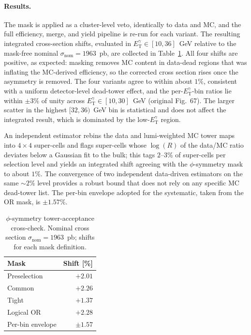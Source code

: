 \documentclass[11pt]{article}
\newcommand{\ETg}{E_{\mathrm{T}}^{\gamma}}
\begin{document}
\paragraph{Results.} The mask is applied as a cluster-level veto, identically to
data and MC, and the full efficiency, merge, and yield pipeline is re-run for each
variant. The resulting integrated cross-section shifts, evaluated in
$\ETg\in[10,36]$~GeV relative to the mask-free nominal
$\sigma_{\mathrm{nom}}=1963$~pb, are collected in Table~\ref{tab:phisym}. All four
shifts are positive, as expected: masking removes MC content in data-dead regions
that was inflating the MC-derived efficiency, so the corrected cross section rises
once the asymmetry is removed. The four variants agree to within about $1\%$,
consistent with a uniform detector-level dead-tower effect, and the per-$\ETg$-bin
ratios lie within $\pm3\%$ of unity across $\ETg\in[10,30]$~GeV (original Fig.~67).
The larger scatter in the highest $[32,36)$~GeV bin is statistical and does not
affect the integrated result, which is dominated by the low-$\ETg$ region.

An independent estimator rebins the data and lumi-weighted MC tower maps into
$4\times4$ super-cells and flags super-cells whose $\log(R)$ of the data/MC ratio
deviates below a Gaussian fit to the bulk; this tags $2$--$3\%$ of super-cells per
selection level and yields an integrated shift agreeing with the $\phi$-symmetry
mask to about $1\%$. The convergence of two independent data-driven estimators on
the same $\sim2\%$ level provides a robust bound that does not rely on any specific
MC dead-tower list. The per-bin envelope adopted for the systematic, taken from
the OR mask, is $\pm1.57\%$.

\begin{table}[h]
\centering
\caption{$\phi$-symmetry tower-acceptance cross-check. Nominal cross section
$\sigma_{\mathrm{nom}}=1963$~pb; shifts for each mask definition.}
\label{tab:phisym}
\begin{tabular}{lr}
\toprule
Mask & Shift [\%] \\
\midrule
Preselection & $+2.01$ \\
Common       & $+2.26$ \\
Tight        & $+1.37$ \\
Logical OR   & $+2.28$ \\
\midrule
Per-bin envelope & $\pm1.57$ \\
\bottomrule
\end{tabular}
\end{table}
\end{document}
